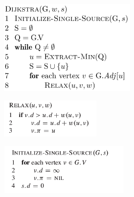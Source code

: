 \documentclass[12pt]{report}
\begin{document}
\begin{figure}[H]
	\begin{Center}
		\includegraphics[width=2.69in,height=1.87in]{./media/image129.png}
	\end{Center}
\end{figure}



\par




\begin{figure}[H]
	\begin{Center}
		\includegraphics[width=1.97in,height=0.77in]{./media/image124.png}
	\end{Center}
\end{figure}



{\fontsize{10pt}{12.0pt}\selectfont \par}\par




\begin{figure}[H]
	\begin{Center}
		\includegraphics[width=2.56in,height=1.01in]{./media/image128.png}
	\end{Center}
\end{figure}
\end{document}
